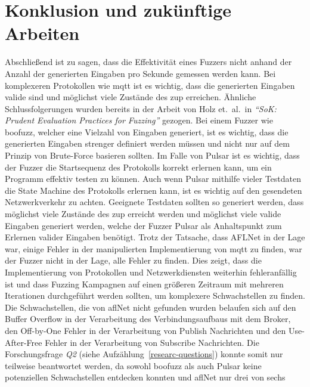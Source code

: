 
\section{Konklusion und zukünftige Arbeiten}\label{sec:conclusion}
Abschließend ist zu sagen, dass die Effektivität eines Fuzzers nicht anhand der Anzahl der generierten Eingaben pro Sekunde
gemessen werden kann.
Bei komplexeren Protokollen wie \gls{mqtt} ist es wichtig, dass die generierten Eingaben valide sind und möglichst viele
Zustände des \gls{zup} erreichen.
Ähnliche Schlussfolgerungen wurden bereits in der Arbeit von Holz et.\ al.\ in \textit{\enquote{SoK: Prudent Evaluation Practices for Fuzzing}}
\cite{fuzzing-evaluation} gezogen.
Bei einem Fuzzer wie boofuzz, welcher eine Vielzahl von Eingaben generiert, ist es wichtig, dass die generierten Eingaben
strenger definiert werden müssen und nicht nur auf dem Prinzip von Brute-Force basieren sollten.
Im Falle von Pulsar ist es wichtig, dass der Fuzzer die Startsequenz des Protokolls korrekt erlernen kann, um ein Programm
effektiv testen zu können.
Auch wenn Pulsar mithilfe vieler Testdaten die State Machine des Protokolls erlernen kann, ist es wichtig auf den gesendeten
Netzwerkverkehr zu achten.
Geeignete Testdaten sollten so generiert werden, dass möglichst viele Zustände des \gls{zup} erreicht werden und möglichst
viele valide Eingaben generiert werden, welche der Fuzzer Pulsar als Anhaltspunkt zum Erlernen valider Eingaben benötigt.\newline\newline
Trotz der Tatsache, dass AFLNet in der Lage war, einige Fehler in der manipulierten Implementierung von \gls{mqtt} zu finden, war der Fuzzer
nicht in der Lage, alle Fehler zu finden.
Dies zeigt, dass die Implementierung von Protokollen und Netzwerkdiensten weiterhin fehleranfällig ist und dass
Fuzzing Kampagnen auf einen größeren Zeitraum mit mehreren Iterationen durchgeführt werden sollten, um komplexere Schwachstellen
zu finden.
Die Schwachstellen, die von \gls{afl}Net nicht gefunden wurden belaufen sich auf den Buffer Overflow in der Verarbeitung
des Verbindungsaufbaus mit dem Broker, den Off-by-One Fehler in der Verarbeitung von Publish Nachrichten und den Use-After-Free
Fehler in der Verarbeitung von Subscribe Nachrichten.
Die Forschungsfrage \textit{Q2} (siehe Aufzählung~\ref{researc-questions}) konnte somit nur teilweise beantwortet werden,
da sowohl boofuzz als auch Pulsar keine potenziellen Schwachstellen entdecken konnten und \gls{afl}Net nur drei von sechs

